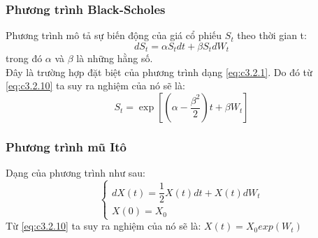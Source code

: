 \documentclass[a4paper]{article}
\numberwithin{equation}{section}
\begin{document}
\subsubsection{Phương trình Black-Scholes}
Phương trình mô tả sự biến động của giá cổ phiếu $S_t$ theo thời gian t:
\begin{equation}\label{eq:c3.2.11}
	dS_t=\alpha S_tdt+\beta S_tdW_t
\end{equation}
trong đó $\alpha$ và $\beta$ là những hằng số.\\
Đây là trường hợp đặt biệt của phương trình dạng \eqref{eq:c3.2.1}. Do đó từ \eqref{eq:c3.2.10} ta suy ra nghiệm của nó sẽ là:
\begin{equation}\label{eq:c3.2.12}
	S_t=\exp\left[\left(\alpha-\dfrac{\beta^2}{2} \right)t+\beta W_t \right]
\end{equation}
\subsubsection{Phương trình mũ Itô}
Dạng của phương trình như sau:
\begin{equation}\label{eq:c3.2.13}
	\begin{cases}
		dX(t)=\dfrac{1}{2}X(t)dt+X(t)dW_t\\
		X(0)=X_0
	\end{cases}
\end{equation}
Từ \eqref{eq:c3.2.10} ta suy ra nghiệm của nó sẽ là: $X(t)=X_0exp(W_t)$\\
\end{document}
